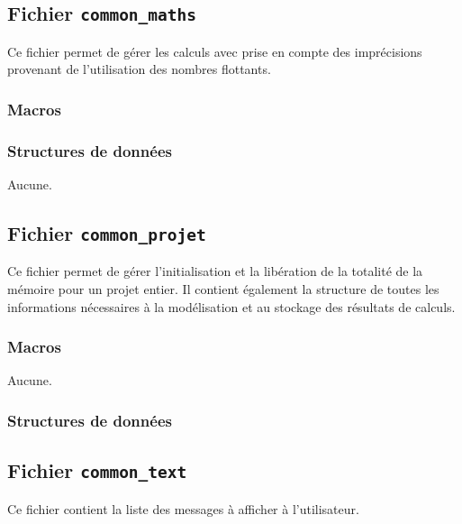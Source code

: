 \documentclass{article}
\begin{document}
\subsection{Fichier {\texttt{common\_maths}}}
Ce fichier permet de gérer les calculs avec prise en compte des imprécisions provenant de l'utilisation des nombres flottants.
\subsubsection{Macros}

\subsubsection{Structures de données}
Aucune.






\subsection{Fichier {\texttt{common\_projet}}}
Ce fichier permet de gérer l'initialisation et la libération de la totalité de la mémoire pour un projet entier. Il contient également la structure de toutes les informations nécessaires à la modélisation et au stockage des résultats de calculs.
\subsubsection{Macros}
Aucune.
\subsubsection{Structures de données}











\subsection{Fichier {\texttt{common\_text}}}
Ce fichier contient la liste des messages à afficher à l'utilisateur.
\end{document}
